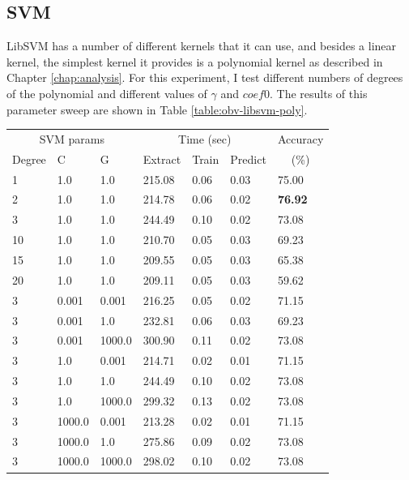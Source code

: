 \documentclass[12pt,oneside]{book}
\begin{document}
%
%
\subsection{SVM}

LibSVM has a number of different kernels that it can use, and besides
a linear kernel, the simplest kernel it provides is a polynomial
kernel as described in Chapter \ref{chap:analysis}.  For this
experiment, I test different numbers of degrees of the polynomial and
different values of $\gamma$ and $coef0$.  The results of this parameter
sweep are shown in Table \ref{table:obv-libsvm-poly}.

\begin{table}
\begin{tabular}{|l|l|l|l|l|l|l|}
\hline
\multicolumn{3}{|c|}{SVM params} & \multicolumn{3}{c|}{Time (sec)} & Accuracy \\
\hhline{|-|-|-|-|-|-|~|}
Degree & C & G & Extract & Train & Predict & \multicolumn{1}{c|}{(\%)} \\
\hhline{|=|=|=|=|=|=|=|}
1  & 1.0    & 1.0     &  215.08  &  0.06  &  0.03  &  75.00  \\
2  & 1.0    & 1.0     &  214.78  &  0.06  &  0.02  &  \textbf{76.92}  \\
3  & 1.0    & 1.0     &  244.49  &  0.10  &  0.02  &  73.08  \\
10 & 1.0    & 1.0     &  210.70  &  0.05  &  0.03  &  69.23  \\
15 & 1.0    & 1.0     &  209.55  &  0.05  &  0.03  &  65.38  \\
20 & 1.0    & 1.0     &  209.11  &  0.05  &  0.03  &  59.62  \\
\hline
3  & 0.001  & 0.001   &  216.25  &  0.05  &  0.02  &  71.15  \\
3  & 0.001  & 1.0     &  232.81  &  0.06  &  0.03  &  69.23  \\
3  & 0.001  & 1000.0  &  300.90  &  0.11  &  0.02  &  73.08  \\
3  & 1.0    & 0.001   &  214.71  &  0.02  &  0.01  &  71.15  \\
3  & 1.0    & 1.0     &  244.49  &  0.10  &  0.02  &  73.08  \\
3  & 1.0    & 1000.0  &  299.32  &  0.13  &  0.02  &  73.08  \\
3  & 1000.0 & 0.001   &  213.28  &  0.02  &  0.01  &  71.15  \\
3  & 1000.0 & 1.0     &  275.86  &  0.09  &  0.02  &  73.08  \\
3  & 1000.0 & 1000.0  &  298.02  &  0.10  &  0.02  &  73.08  \\

\end{tabular}
\end{table}
\end{document}

